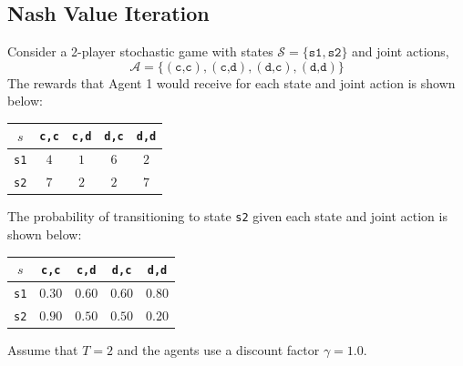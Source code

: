 \subsection{\points[14] Nash Value Iteration}
Consider a 2-player stochastic game with states $\mathcal{S}=\{\texttt{s1},\texttt{s2}\}$
and joint actions,
\[\mathcal{A}=\{(\texttt{c,c}),(\texttt{c,d}),(\texttt{d,c}),(\texttt{d,d})\}\]
\medskip\noindent
The rewards that Agent 1 would receive for each state and joint action is shown below:
\begin{table}[H]
\centering
\begin{tabular}{|c|c|c|c|c|}
\hline
$s$ & \texttt{c,c} & \texttt{c,d} & \texttt{d,c} & \texttt{d,d} \\\hline
\texttt{s1} & $4$ & $1$ & $6$ & $2$ \\\hline
\texttt{s2} & $7$ & $2$ & $2$ & $7$ \\\hline
\end{tabular}
\end{table}
\noindent
\noindent The probability of transitioning to state \texttt{s2} given each state and joint action is shown below:
\begin{table}[H]
\centering
\begin{tabular}{|c|c|c|c|c|}
\hline
$s$ & \texttt{c,c} & \texttt{c,d} & \texttt{d,c} & \texttt{d,d} \\\hline
\texttt{s1} & $0.30$ & $0.60$ & $0.60$ & $0.80$ \\\hline
\texttt{s2} & $0.90$ & $0.50$ & $0.50$ & $0.20$ \\\hline
\end{tabular}
\end{table}
\noindent
\noindent Assume that $T=2$ and the agents use a discount factor $\gamma=1.0$.
